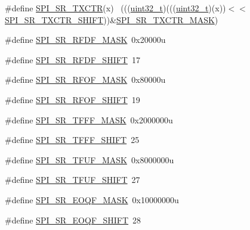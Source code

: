 \begin{DoxyCompactItemize}
\item 
\#define \hyperlink{group___s_p_i___register___masks_gabdf4b9089966cd6a6ddfbcefa762809a}{S\+P\+I\+\_\+\+S\+R\+\_\+\+T\+X\+C\+TR}(x)                                                ~(((\hyperlink{_p_e___types_8h_a33594304e786b158f3fb30289278f5af}{uint32\+\_\+t})(((\hyperlink{_p_e___types_8h_a33594304e786b158f3fb30289278f5af}{uint32\+\_\+t})(x))$<$$<$\hyperlink{group___s_p_i___register___masks_gad7fc9ecdd51f12aabb492271648e133b}{S\+P\+I\+\_\+\+S\+R\+\_\+\+T\+X\+C\+T\+R\+\_\+\+S\+H\+I\+FT}))\&\hyperlink{group___s_p_i___register___masks_gaba58e43f829f6e6103933bf570e9feb7}{S\+P\+I\+\_\+\+S\+R\+\_\+\+T\+X\+C\+T\+R\+\_\+\+M\+A\+SK})
\item 
\#define \hyperlink{group___s_p_i___register___masks_ga71c5bf00b7a6fdd6df9f46068d43cc90}{S\+P\+I\+\_\+\+S\+R\+\_\+\+R\+F\+D\+F\+\_\+\+M\+A\+SK}~0x20000u
\item 
\#define \hyperlink{group___s_p_i___register___masks_gab969720c704e5da43908b804881bd512}{S\+P\+I\+\_\+\+S\+R\+\_\+\+R\+F\+D\+F\+\_\+\+S\+H\+I\+FT}~17
\item 
\#define \hyperlink{group___s_p_i___register___masks_gaec13b65c44bed521e4800ecd6f7e838a}{S\+P\+I\+\_\+\+S\+R\+\_\+\+R\+F\+O\+F\+\_\+\+M\+A\+SK}~0x80000u
\item 
\#define \hyperlink{group___s_p_i___register___masks_ga6ceb5392843b8d85ed2f00305b524870}{S\+P\+I\+\_\+\+S\+R\+\_\+\+R\+F\+O\+F\+\_\+\+S\+H\+I\+FT}~19
\item 
\#define \hyperlink{group___s_p_i___register___masks_gaa2b1ac1e36caec8d6c547c45e9436b5d}{S\+P\+I\+\_\+\+S\+R\+\_\+\+T\+F\+F\+F\+\_\+\+M\+A\+SK}~0x2000000u
\item 
\#define \hyperlink{group___s_p_i___register___masks_ga8cc4f0762da38ecb90793428c8e5a26c}{S\+P\+I\+\_\+\+S\+R\+\_\+\+T\+F\+F\+F\+\_\+\+S\+H\+I\+FT}~25
\item 
\#define \hyperlink{group___s_p_i___register___masks_gaa7abad389fa7a46434442b742d4a35c3}{S\+P\+I\+\_\+\+S\+R\+\_\+\+T\+F\+U\+F\+\_\+\+M\+A\+SK}~0x8000000u
\item 
\#define \hyperlink{group___s_p_i___register___masks_ga0e5f44b6803f40e8db0718fe2812092a}{S\+P\+I\+\_\+\+S\+R\+\_\+\+T\+F\+U\+F\+\_\+\+S\+H\+I\+FT}~27
\item 
\#define \hyperlink{group___s_p_i___register___masks_gaf90e19a9b8d8a54d8ae278820d8f1558}{S\+P\+I\+\_\+\+S\+R\+\_\+\+E\+O\+Q\+F\+\_\+\+M\+A\+SK}~0x10000000u
\item 
\#define \hyperlink{group___s_p_i___register___masks_ga0395371ab4e76da4f99c89bc6963e816}{S\+P\+I\+\_\+\+S\+R\+\_\+\+E\+O\+Q\+F\+\_\+\+S\+H\+I\+FT}~28
$$
\end{DoxyCompactItemize}

